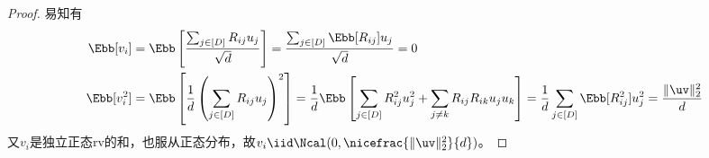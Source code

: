 \documentclass{ctexart}
\begin{document}
\begin{proof}
    易知有
    \begin{align*}
        \Ebb [v_i]   & = \Ebb \left[ \frac{\sum_{j \in [D]} R_{ij} u_j}{\sqrt{d}} \right] = \frac{\sum_{j \in [D]} \Ebb [R_{ij}] u_j}{\sqrt{d}} = 0                                                                                                                                        \\
        \Ebb [v_i^2] & = \Ebb \left[ \frac{1}{d} \left( \sum_{j \in [D]} R_{ij} u_j \right)^2 \right] = \frac{1}{d} \Ebb \left[ \sum_{j \in [D]} R_{ij}^2 u_j^2 + \sum_{j \ne k} R_{ij} R_{ik} u_j u_k \right] = \frac{1}{d} \sum_{j \in [D]} \Ebb[R_{ij}^2] u_j^2 = \frac{\|\uv\|_2^2}{d}
    \end{align*}
    又$v_i$是独立正态rv的和，也服从正态分布，故$v_i \iid \Ncal(0, \nicefrac{\|\uv\|_2^2}{d})$。


\end{proof}
\end{document}
